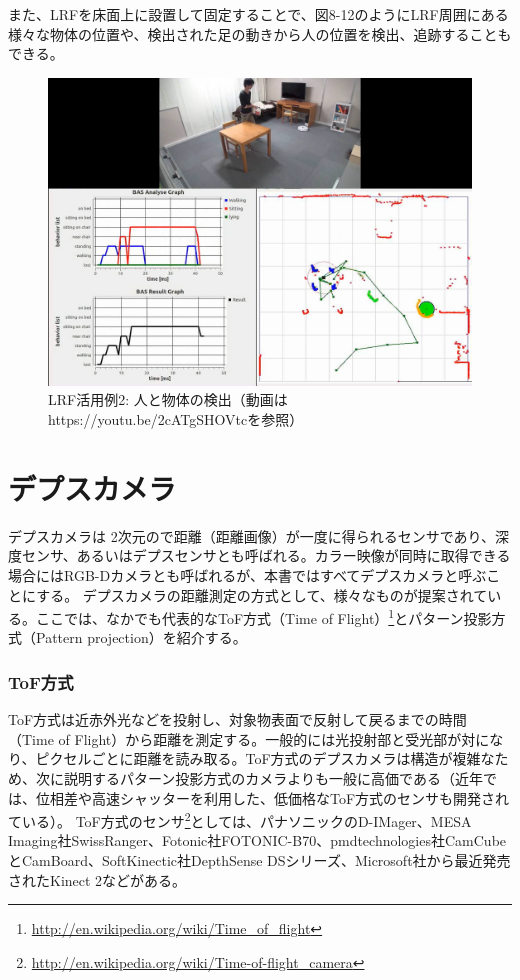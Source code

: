 また、LRFを床面上に設置して固定することで、図8-12のようにLRF周囲にある様々な物体の位置や、検出された足の動きから人の位置を検出、追跡することもできる。

\begin{figure}[htp]
  \centering
  \includegraphics[width=12cm]{pictures/chapter8/pic_08_12.png}
  \caption{LRF活用例2: 人と物体の検出（動画はhttps://youtu.be/2cATgSHOVtcを参照）}
\end{figure}

\section{デプスカメラ}

デプスカメラは 2次元ので距離（距離画像）が一度に得られるセンサであり、深度センサ、あるいはデプスセンサとも呼ばれる。カラー映像が同時に取得できる場合にはRGB-Dカメラとも呼ばれるが、本書ではすべてデプスカメラと呼ぶことにする。
デプスカメラの距離測定の方式として、様々なものが提案されている。ここでは、なかでも代表的なToF方式（Time of Flight）\footnote{\url{http://en.wikipedia.org/wiki/Time\_of\_flight}}とパターン投影方式（Pattern projection）を紹介する。

\subsubsection{ToF方式}

ToF方式は近赤外光などを投射し、対象物表面で反射して戻るまでの時間（Time of Flight）から距離を測定する。一般的には光投射部と受光部が対になり、ピクセルごとに距離を読み取る。ToF方式のデプスカメラは構造が複雑なため、次に説明するパターン投影方式のカメラよりも一般に高価である（近年では、位相差や高速シャッターを利用した、低価格なToF方式のセンサも開発されている）。
ToF方式のセンサ\footnote{\url{http://en.wikipedia.org/wiki/Time-of-flight\_camera}}としては、パナソニックのD-IMager、MESA Imaging社SwissRanger、Fotonic社FOTONIC-B70、pmdtechnologies社CamCubeとCamBoard、SoftKinectic社DepthSense DSシリーズ、Microsoft社から最近発売されたKinect 2などがある。


